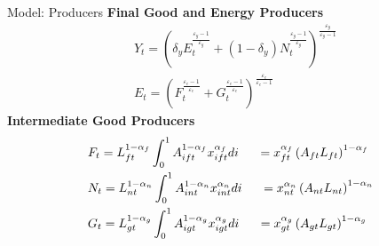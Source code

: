 \documentclass[11pt,aspectratio=169]{beamer}
\begin{document}
\begin{frame}{Model: Producers}
	\textbf{Final Good and Energy Producers }
	\vspace{-3mm}
\begin{align*}
&Y_t=\left(\delta_yE_t^\frac{\varepsilon_y-1}{\varepsilon_y}+(1-\delta_y)N_t^\frac{\varepsilon_y-1}{\varepsilon_y}\right)^\frac{\varepsilon_y}{\varepsilon_y-1}\\
&E_t=\left({F}_t^\frac{\varepsilon_e-1}{\varepsilon_e}+G_t^\frac{\varepsilon_e-1}{\varepsilon_e}\right)^\frac{\varepsilon_e}{\varepsilon_e-1}
\end{align*}
\textbf{Intermediate Good Producers}
\begin{align*}
&F_{t}=L_{ft}^{1-\alpha_f}\int_{0}^{1}A^{1-\alpha_f}_{ift}x_{ift}^{\alpha_f}di \ \hspace{4mm}=x_{ft}^{\alpha_f}\left(A_{ft}L_{ft}\right)^{1-\alpha_f} \\
&N_t= L_{nt}^{1-\alpha_n}\int_{0}^{1}A^{1-\alpha_n}_{int}x_{int}^{\alpha_n}di\ \hspace{4mm}=x_{nt}^{\alpha_n}\left(A_{nt}L_{nt}\right)^{1-\alpha_n}\\
&G_t= L_{gt}^{1-\alpha_g}\int_{0}^{1}A^{1-\alpha_g}_{igt}x_{igt}^{\alpha_g}di\ \hspace{4mm}=x_{gt}^{\alpha_g}\left(A_{gt}L_{gt}\right)^{1-\alpha_g}
\end{align*}
\end{frame}
\end{document}
